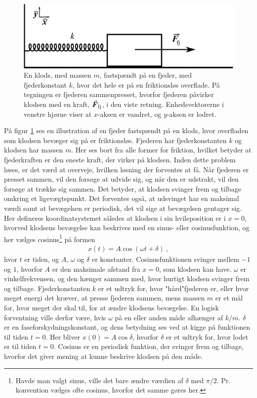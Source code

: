 \begin{figure}[h!]
	\centering
	\includegraphics[width=.75\textwidth]{Analytisk-Mekanik/Fjeder.pdf}
	\caption{En klods, med massen $m$, fastspændt på en fjeder, med fjederkonstant $k$, hvor det hele er på en friktionsløs overflade. På tegningen er fjederen sammenpresset, hvorfor fjederen påvirker klodsen med en kraft, ${\vec{\boldsymbol{F}}}_\mathrm{fj}$, i den viste retning. Enhedsvektorerne i venstre hjørne viser at $x$-aksen er vandret, og $y$-aksen er lodret.} \label{fig:fjeder}
\end{figure}
%
På figur \ref{fig:fjeder} ses en illustration af en fjeder fastspændt på en klods, hvor overfladen som klodsen bevæger sig på er friktionsløs. Fjederen har fjederkonstanten $k$ og klodsen har massen $m$. Her ses bort fra alle former for friktion, hvilket betyder at fjederkraften er den eneste kraft, der virker på klodsen. Inden dette problem løses, er det værd at overveje, hvilken løsning der forventes at få. Når fjederen er presset sammen, vil den forsøge at udvide sig, og når den er udstrakt, vil den forsøge at trække sig sammen. Det betyder, at klodsen svinger frem og tilbage omkring et ligevægtspunkt. Det forventes også, at udsvinget har en maksimal værdi samt at bevægelsen er periodisk, det vil sige at bevægelsen gentager sig. Her defineres koordinatsystemet således at klodsen i sin hvileposition er i $x = 0$, hvorved klodsens bevægelse kan beskrives med en sinus- eller cosinusfunktion, og her vælges cosinus\footnote{Havde man valgt sinus, ville det bare ændre værdien af $\delta$ med $\pi/2$. Pr. konvention vælges ofte cosinus, hvorfor det samme gøres her.} på formen
%
\begin{align} \label{eq:FjederSted}
	x(t) = A\cos(\omega t + \delta) \: ,
\end{align}
%
hvor $t$ er tiden, og $A$, $\omega$ og $\delta$ er konstanter. Cosinusfunktionen svinger mellem $-1$ og $1$, hvorfor $A$ er den maksimale afstand fra $x=0$, som klodsen kan have. $\omega$ er vinkelfrekvensen, og den hænger sammen med, hvor hurtigt klodsen svinger frem og tilbage. Fjederkonstanten $k$ er et udtryk for, hvor "hård"\;fjederen er, eller hvor meget energi det kræver, at presse fjederen sammen, mens massen $m$ er et mål for, hvor meget der skal til, for at ændre klodsens bevægelse. En logisk forventning ville derfor være, hvis $\omega$ på en eller anden måde afhænger af $k/m$. $\delta$ er en faseforskydningskonstant, og dens betydning ses ved at kigge på funktionen til tiden $t=0$. Her bliver $x(0) = A\cos\delta$, hvorfor $\delta$ er et udtryk for, hvor lodet er til tiden $t=0$. Cosinus er en periodisk funktion, der svinger frem og tilbage, hvorfor det giver mening at kunne beskrive klodsen på den måde. \\

